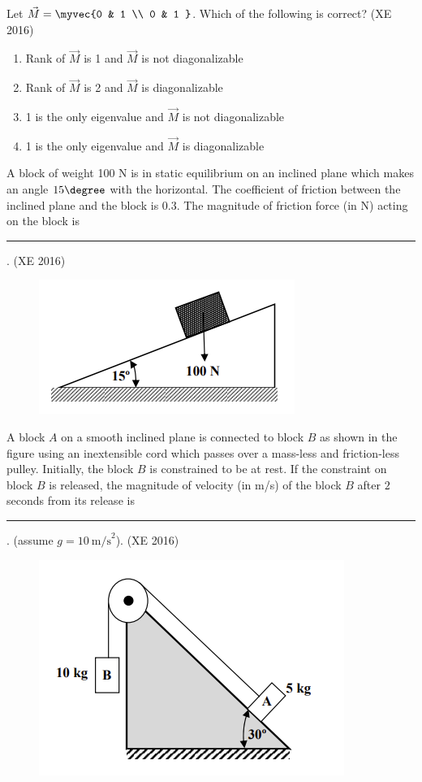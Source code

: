 \item Let $\vec{M} = \myvec{0 & 1 \\ 0 & 1 }$. Which of the following is correct?
\hfill(XE 2016)
\begin{enumerate}
\item Rank of $\vec{M}$ is 1 and $\vec{M}$ is not diagonalizable
\item Rank of $\vec{M}$ is 2 and $\vec{M}$ is diagonalizable
\item 1 is the only eigenvalue and $\vec{M}$ is not diagonalizable
\item 1 is the only eigenvalue and $\vec{M}$ is diagonalizable
\end{enumerate}
\item A block of weight 100 N is in static equilibrium on an inclined plane which makes an angle $15\degree$ with the horizontal. The coefficient of friction between the inclined plane and the block is 0.3. The magnitude of friction force (in N) acting on the block is  \rule{1cm}{0.01pt}.
\hfill(XE 2016)
\begin{figure}[H]
    \centering
    \includegraphics[width=0.5\columnwidth]{GATE/2016/XE/figs/ass3_d_q3.png}
    \caption{}
    \label{fig:placeholder-xeq3}
\end{figure}
\item A block $A$ on a smooth inclined plane is connected to block $B$ as shown in the figure using an inextensible cord which passes over a mass-less and friction-less pulley. Initially, the block $B$ is constrained to be at rest. If the constraint on block $B$ is released, the magnitude of velocity (in m/s) of the block $B$ after $2$ seconds from its release is \rule{1cm}{0.01pt}. (assume $g=10 \ \text{m/s}^2$).
\hfill(XE 2016)
\begin{figure}[H]
    \centering
    \includegraphics[width=0.5\columnwidth]{GATE/2016/XE/figs/ass3_d_q11.png}
    \caption{}
    \label{fig:placeholder-xeq11}
\end{figure}



